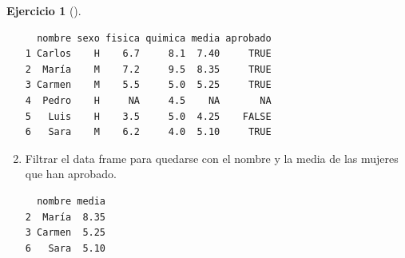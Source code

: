 \documentclass[
  a4paper,
]{scrreport}
\newenvironment{Shaded}{\begin{snugshade}}{\end{snugshade}}
\newcommand{\DecValTok}[1]{\textcolor[rgb]{0.68,0.00,0.00}{#1}}
\newcommand{\FunctionTok}[1]{\textcolor[rgb]{0.28,0.35,0.67}{#1}}
\newcommand{\NormalTok}[1]{\textcolor[rgb]{0.00,0.23,0.31}{#1}}
\newcommand{\SpecialCharTok}[1]{\textcolor[rgb]{0.37,0.37,0.37}{#1}}
\newcommand{\StringTok}[1]{\textcolor[rgb]{0.13,0.47,0.30}{#1}}
\theoremstyle{definition}
\newtheorem{exercise}{Ejercicio}[chapter]
\theoremstyle{remark}
\begin{document}
\begin{exercise}[]
\begin{enumerate}
\begin{tcolorbox}
\begin{verbatim}
  nombre sexo fisica quimica media aprobado
1 Carlos    H    6.7     8.1  7.40     TRUE
2  María    M    7.2     9.5  8.35     TRUE
3 Carmen    M    5.5     5.0  5.25     TRUE
4  Pedro    H     NA     4.5    NA       NA
5   Luis    H    3.5     5.0  4.25    FALSE
6   Sara    M    6.2     4.0  5.10     TRUE
\end{verbatim}

  \end{tcolorbox}
\item
  Filtrar el data frame para quedarse con el nombre y la media de las
  mujeres que han aprobado.

  \begin{tcolorbox}[enhanced jigsaw, coltitle=black, left=2mm, colback=white, leftrule=.75mm, toptitle=1mm, breakable, bottomrule=.15mm, titlerule=0mm, bottomtitle=1mm, title=\textcolor{quarto-callout-tip-color}{\faLightbulb}\hspace{0.5em}{Solución}, arc=.35mm, toprule=.15mm, rightrule=.15mm, colframe=quarto-callout-tip-color-frame, opacityback=0, colbacktitle=quarto-callout-tip-color!10!white, opacitybacktitle=0.6]

\begin{Shaded}
\end{Shaded}

\begin{verbatim}
  nombre media
2  María  8.35
3 Carmen  5.25
6   Sara  5.10
\end{verbatim}

  \end{tcolorbox}
\end{enumerate}

\end{exercise}
\end{document}
